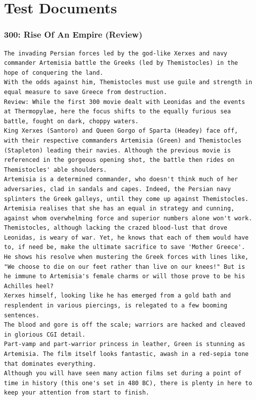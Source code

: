 \documentclass[BTech]{nitgoathesis}
\begin{document}
\section{Test Documents}
\subsubsection{300: Rise Of An Empire (Review)}
\begin{lstlisting}[basicstyle=\scriptsize]
The invading Persian forces led by the god-like Xerxes and navy commander Artemisia battle the Greeks (led by Themistocles) in the hope of conquering the land.
With the odds against him, Themistocles must use guile and strength in equal measure to save Greece from destruction. 
Review: While the first 300 movie dealt with Leonidas and the events at Thermopylae, here the focus shifts to the equally furious sea battle, fought on dark, choppy waters.
King Xerxes (Santoro) and Queen Gorgo of Sparta (Headey) face off, with their respective commanders Artemisia (Green) and Themistocles (Stapleton) leading their navies. Although the previous movie is referenced in the gorgeous opening shot, the battle then rides on Themistocles' able shoulders.
Artemisia is a determined commander, who doesn't think much of her adversaries, clad in sandals and capes. Indeed, the Persian navy splinters the Greek galleys, until they come up against Themistocles.
Artemisia realises that she has an equal in strategy and cunning, against whom overwhelming force and superior numbers alone won't work.
Themistocles, although lacking the crazed blood-lust that drove Leonidas, is weary of war. Yet, he knows that each of them would have to, if need be, make the ultimate sacrifice to save 'Mother Greece'.
He shows his resolve when mustering the Greek forces with lines like, "We choose to die on our feet rather than live on our knees!" But is he immune to Artemisia's female charms or will those prove to be his Achilles heel?
Xerxes himself, looking like he has emerged from a gold bath and resplendent in various piercings, is relegated to a few booming sentences.
The blood and gore is off the scale; warriors are hacked and cleaved in glorious CGI detail.
Part-vamp and part-warrior princess in leather, Green is stunning as Artemisia. The film itself looks fantastic, awash in a red-sepia tone that dominates everything.
Although you will have seen many action films set during a point of time in history (this one's set in 480 BC), there is plenty in here to keep your attention from start to finish.
\end{lstlisting}
\end{document}
